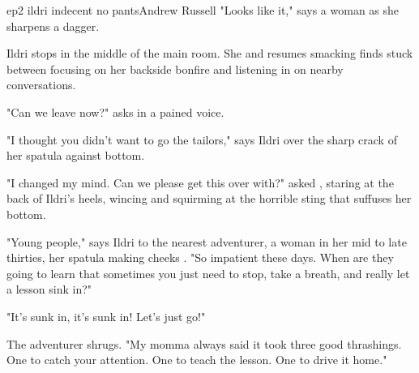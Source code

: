 \documentclass{book}
\begin{document}
\begin{childnode}{ep2 ildri indecent no pants}{Andrew Russell}
"Looks like it," says a woman as she sharpens a dagger.

Ildri stops in the middle of the main room. She  and resumes smacking  \name{}
finds \himselfherself{} stuck between focusing on her backside bonfire and listening in on nearby conversations.




"Can we leave now?" asks \name{} in a pained voice.

"I thought you didn't want to go the tailors," says Ildri over the sharp crack of her spatula against \names{} bottom.

"I changed my mind. Can we please get this over with?" asked \name{}, staring at the back of Ildri's heels, wincing and squirming at the horrible sting that suffuses her bottom.

"Young people," says Ildri to the nearest adventurer, a woman in her mid to late thirties, her spatula making \names{}  cheeks \quiver{}.  "So impatient these 
days. When are they going to learn that sometimes you just need to stop, take a breath, and really let a lesson sink in?"

"It's sunk in, it's sunk in! Let's just go!"

The adventurer shrugs. "My momma always said it took three good thrashings. One to catch your attention. One to teach the lesson. One to drive it home."


\end{childnode}
\end{document}
